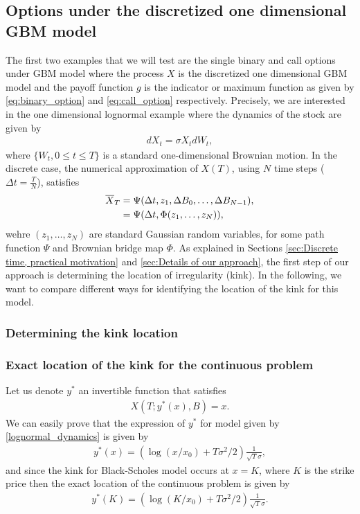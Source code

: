 \FloatBarrier

\subsection{Options under the discretized one dimensional GBM model}\label{sec:The discretized 1D Black-Scholes}
The first two  examples that we will  test are  the single binary and  call options under GBM model where the process $X$ is the discretized one dimensional GBM model and the payoff function $g$ is the indicator or maximum function as given by \eqref{eq:binary_option} and \eqref{eq:call_option} respectively. Precisely, we are interested in the  one dimensional lognormal example where the dynamics of the stock are given by
\begin{align}\label{lognormal_dynamics}
	dX_t=\sigma X_t dW_t,
\end{align}
where $\{W_t, 0 \leq t \leq T\} $ is a standard one-dimensional Brownian motion. In the discrete case, the numerical approximation of $X(T)$, using $N$ time steps ($\Delta t=\frac{T}{N}$), satisfies
\begin{align}
	\overline{X}_T&=\Psi(\Delta t, z_1, \Delta B_0,\dots,\Delta B_{N-1}), \\ \nonumber
	&=\Psi(\Delta t, \Phi(z_1,\dots,z_N)),
\end{align}
wehre $(z_1,\dots,z_N)$ are standard Gaussian random variables, for some path function $\Psi$ and Brownian bridge map $\Phi$. As explained in Sections \ref{sec:Discrete time, practical motivation} and \ref{sec:Details of our approach}, the first step of our approach is determining the location of irregularity (kink). In the following, we want to compare different ways for identifying the location of the kink for this model.
\subsubsection{Determining the kink location}\label{sec:Determining the kink location}
\subsubsection*{Exact location of the kink for the continuous problem}
Let us denote $y^{\ast}$ an invertible function that satisfies 
\begin{align}\label{eq: kink_point_problem}
	X(T;y^{\ast}(x),B)=x.
\end{align}
We can easily prove that the expression of $y^{\ast}$ for model given by \eqref{lognormal_dynamics} is given by
\begin{align}
	y^{\ast}(x)=\left(\operatorname{log}(x/x_0)+T \sigma^2/2\right) \frac{1}{\sqrt{T} \sigma}, 
\end{align}
and since the kink for Black-Scholes model occurs at $x=K$, where $K
$ is the strike price then  the exact location of the continuous problem is given by 
\begin{align}\label{xact_location_continuous_problem}
	y^{\ast}(K)=\left(\operatorname{log}(K/x_0)+T \sigma^2/2\right) \frac{1}{\sqrt{T} \sigma}.
\end{align}
